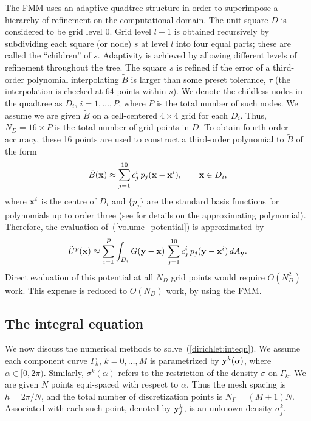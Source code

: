 \documentclass[preprint,12pt]{elsarticle}
\newcommand{\x}{{\bf x}}
\newcommand{\y}{{\bf y}}
\newcommand{\eqr}[1]{~(\ref{#1})}
\begin{document}
The FMM uses an adaptive quadtree structure in order to superimpose a hierarchy of refinement on the computational domain. 
The unit square $D$ is considered to be grid level 0. Grid level $l+1$ is obtained recursively by subdividing each square (or node) $s$ at level $l$ into four equal parts; these are called the ``children'' of $s$. 
Adaptivity is achieved by allowing different levels of refinement throughout the tree.
The square $s$ is refined if the error of a third-order polynomial interpolating $\tilde{B}$ is larger than some preset tolerance, $\tau$ (the interpolation is checked at 64 points within $s$).  
We denote the childless nodes in the quadtree as $D_i$, $i=1, \ldots, P$, where $P$ is the total number of such nodes. 
We assume we are given $\tilde{B}$ on a cell-centered $4\times 4$ grid for each $D_i$. 
Thus, $N_D = 16 \times P$ is the total number of grid points in $D$. 
To obtain fourth-order accuracy, these 16 points are used to construct a third-order polynomial to $\tilde{B}$ of the form
\[
  \tilde{B}(\x) \approx \sum_{j=1}^{10} c^i_j \, p_j (\x-\x^i), \qquad \x \in D_i, 
\] 
where $\x^i$ is the centre of $D_i$ and $\{ p_{j} \}$ are the standard basis functions for polynomials up to
order three
(see \cite{modified:helmholtz,greengard:ethridge} for details on the approximating polynomial).
Therefore, the evaluation of\eqr{volume_potential} is approximated by 
\[
  \tilde{U}^p (\x) \approx \sum_{i=1}^P 
    \int_{D_i} G(\y - \x ) \, \sum_{j=1}^{10} c^i_j \, p_j (\y-\x^i) \, dA_{\y} .
 \]
Direct evaluation of this potential at all $N_D$ grid points would require $O(N^2_D)$ work. 
This expense is reduced to $O(N_D)$ work, by using the FMM.

\subsection{The integral equation}
We now discuss the numerical methods to solve\eqr{dirichlet:inteqn}.
We assume each component curve $\Gamma_k$, $k=0,\ldots, M$ is
parametrized by $\y^k(\alpha)$, where $\alpha \in [0, 2\pi)$. Similarly, $\sigma^k(\alpha)$ refers to the restriction of the density $\sigma$ on $\Gamma_k$.
We are given $N$ points equi-spaced with respect
to $\alpha$. Thus the mesh spacing is $h = 2\pi/N$, and the total
number of discretization points is $N_\Gamma = (M+1) N$. Associated with each
such point, denoted by $\y^k_j$, is an unknown density $\sigma^k_j$.
\end{document}
